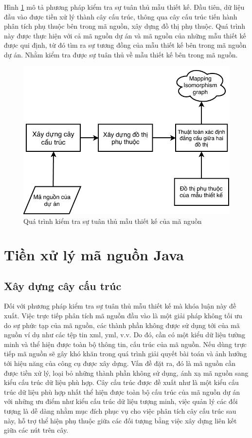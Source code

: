 \documentclass[12pt]{report}
\begin{document}
\noindent Hình \ref{fig:general_architecture} mô tả phương pháp kiểm tra sự tuân thủ mẫu thiết kế. Đầu tiên, dữ liệu đầu vào được tiền xử lý thành cây cấu trúc, thông qua cây cấu trúc tiến hành phân tích phụ thuộc bên trong mã nguồn, xây dựng đồ thị phụ thuộc. Quá trình này được thực hiện với cả mã nguồn dự án và mã nguồn của những mẫu thiết kế được qui định, từ đó tìm ra sự tương đồng của mẫu thiết kế bên trong mã nguồn dự án. Nhằm kiểm tra được sự tuân thủ về mẫu thiết kế bên trong mã nguồn.
\begin{figure}[h]
	\centering
	\includegraphics[scale=1.1]{images/general_architecture_3_1_2}
	\caption{Quá trình kiểm tra sự tuân thủ mẫu thiết kế của mã nguồn}
	\label{fig:general_architecture}
\end{figure}
\section{Tiền xử lý mã nguồn Java}
\subsection{Xây dựng cây cấu trúc}
Đối với phương pháp kiểm tra sự tuân thủ mẫu thiết kế mà khóa luận này đề xuất. Việc trực tiếp phân tích mã nguồn đầu vào là một giải pháp không tối ưu do sự phức tạp của mã nguồn, các thành phần không được sử dụng tới của mã nguồn ví dụ như các tệp tin xml, yml, v.v. Do đó, cần có một kiểu dữ liệu tường minh và thể hiện được toàn bộ thông tin, cấu trúc của mã nguồn. Nếu dùng trực tiếp mã nguồn sẽ gây khó khăn trong quá trình giải quyết bài toán và ảnh hưởng tới hiệu năng của công cụ được xây dựng. Vấn đề đặt ra, đó là mã nguồn cần được tiền xử lý, loại bỏ những thành phần không sử dụng, ánh xạ mã nguồn sang kiểu cấu trúc dữ liệu phù hợp. Cây cấu trúc được đề xuất như là một kiểu cấu trúc dữ liệu phù hợp nhất thể hiện được toàn bộ cấu trúc của mã nguồn dự án với những ưu điểm như kiểu cấu trúc dữ liệu tượng minh, việc quản lý các đối tượng là dễ dàng nhằm mục đích phục vụ cho việc phân tích cây cấu trúc sau này, hỗ trợ thể hiện phụ thuộc giữa các đối tượng bằng việc xây dựng liên kết giữa các nút trên cây.
\end{document}
